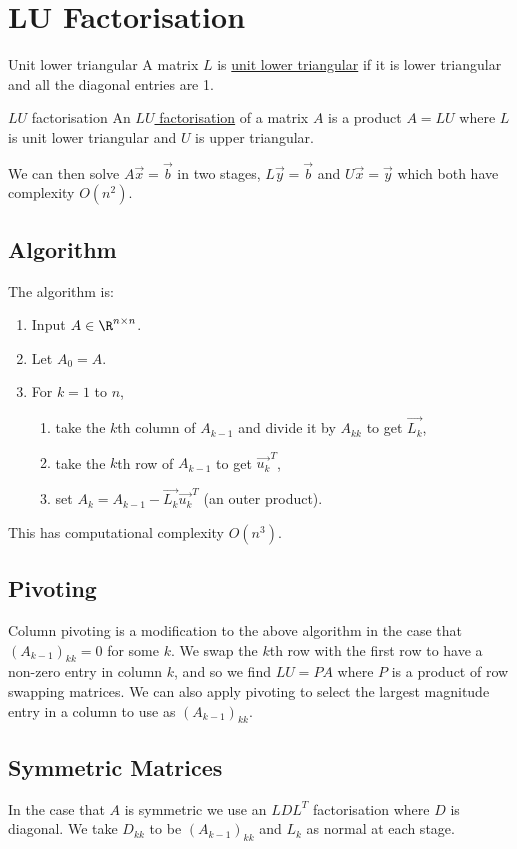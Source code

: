 \documentclass[../Main.tex]{subfiles}
\begin{document}
\section{LU Factorisation}
\begin{definition}{Unit lower triangular}
    A matrix $L$ is \underline{unit lower triangular} if it is lower triangular and all the diagonal entries are 1.
\end{definition}
\begin{definition}{$LU$ factorisation}
    An \underline{$LU$ factorisation} of a matrix $A$ is a product $A = LU$ where $L$ is unit lower triangular and $U$ is upper triangular.
\end{definition}
We can then solve $A\vec{x} = \vec{b}$ in two stages, $L\vec{y} = \vec{b}$ and $U\vec{x} = \vec{y}$ which both have complexity $O(n^2)$.
\subsection{Algorithm}
The algorithm is:
\begin{enumerate}
    \item Input $A \in \R^{n \times n}$.
    \item Let $A_0 = A$.
    \item For $k = 1$ to $n$,
    \begin{enumerate}
        \item take the $k$th column of $A_{k-1}$ and divide it by $A_{kk}$ to get $\vec{L_k}$,
        \item take the $k$th row of $A_{k-1}$ to get $\vec{u_{k}}^T$,
        \item set $A_k = A_{k-1} - \vec{L_{k}} \vec{u_{k}}^T$ (an outer product).
    \end{enumerate}
\end{enumerate}
This has computational complexity $O(n^3)$.
\subsection{Pivoting}
Column pivoting is a modification to the above algorithm in the case that $(A_{k-1})_{kk} = 0$ for some $k$. We swap the $k$th row with the first row to have a non-zero entry in column $k$, and so we find $LU = PA$ where $P$ is a product of row swapping matrices. We can also apply pivoting to select the largest magnitude entry in a column to use as $(A_{k-1})_{kk}$.
\subsection{Symmetric Matrices}
In the case that $A$ is symmetric we use an $LDL^T$ factorisation where $D$ is diagonal. We take $D_{kk}$ to be $(A_{k-1})_{kk}$ and $L_k$ as normal at each stage.
\end{document}
